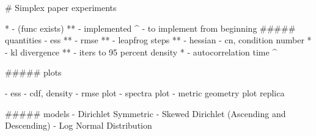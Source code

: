 # Simplex paper experiments

* - (func exists)
** - implemented
^ - to implement from beginning
##### quantities
- ess **
- rmse **
- leapfrog steps **
- hessian - cn, condition number *
- kl divergence **
- iters to 95 percent density *
- autocorrelation time ^

##### plots

- ess - cdf, density
- rmse plot
- spectra plot
- metric geometry plot replica

##### models
- Dirichlet Symmetric
- Skewed Dirichlet (Ascending and Descending)
- Log Normal Distribution
